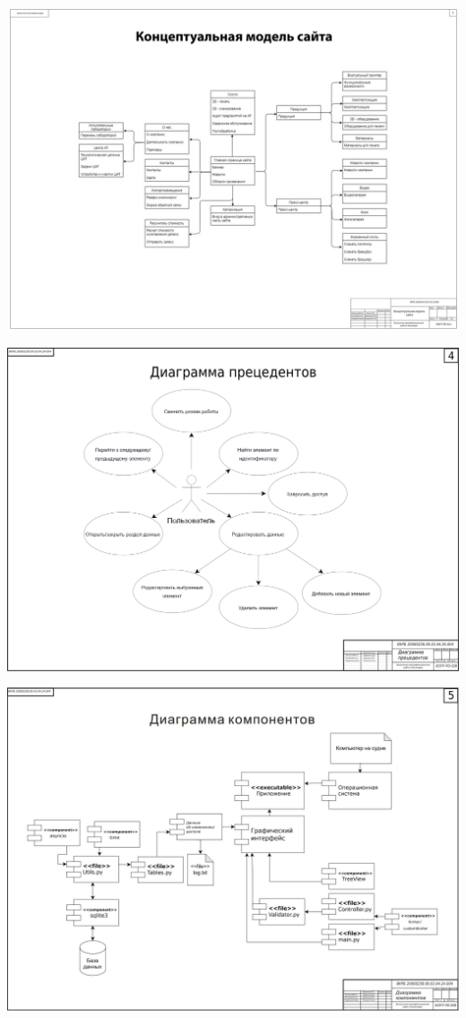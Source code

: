 \begin{landscape}
\begin{плакат}
	\includegraphics[width=0.82\linewidth]{images/плакат3}
	\label{fig:3}
\end{плакат}

\begin{плакат}
	\includegraphics[width=0.82\linewidth]{images/плакат4}
	\label{fig:4}
\end{плакат}

\begin{плакат}
	\includegraphics[width=0.82\linewidth]{images/плакат5}
	\label{fig:5}
\end{плакат}


\end{landscape}
